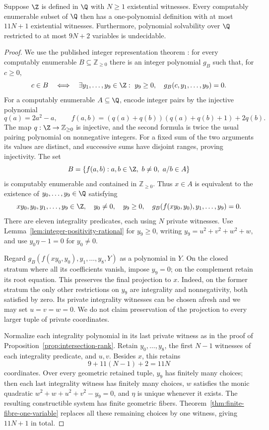 \begin{proposition}\label{prop:quantitative-mrdp}
Suppose $\Z$ is defined in $\Q$ with $N\ge1$ existential witnesses.
Every computably enumerable subset of $\Q$ then has a one-polynomial
definition with at most $11N+1$ existential witnesses. Furthermore,
polynomial solvability over $\Q$ restricted to at most $9N+2$
variables is undecidable.
\end{proposition}
\begin{proof}
We use the published integer representation theorem
\cite[Theorem 1.1(i)]{Sun2021}: for every computably enumerable
$B\subseteq\mathbb Z_{\ge0}$ there is an integer polynomial $g_B$
such that, for $c\ge0$,
\[
 c\in B\quad\Longleftrightarrow\quad
 \exists y_1,\ldots,y_9\in\Z:\
 y_9\ge0,\quad g_B(c,y_1,\ldots,y_9)=0.
\]
For a computably enumerable $A\subseteq\Q$, encode integer pairs
by the injective polynomial
\[
 q(a)=2a^2-a,\qquad
 f(a,b)=(q(a)+q(b))(q(a)+q(b)+1)+2q(b).
\]
The map $q:\Z\to\mathbb Z_{\ge0}$ is injective, and the second
formula is twice the usual pairing polynomial on nonnegative integers.
For a fixed sum of the two arguments its values are distinct, and
successive sums have disjoint ranges, proving injectivity.
The set
\[
 B=\{f(a,b):a,b\in\Z,\ b\ne0,\ a/b\in A\}
\]
is computably enumerable and contained in $\mathbb Z_{\ge0}$.
Thus $x\in A$ is equivalent to the existence of
$y_0,\ldots,y_9\in\Q$ satisfying
\[
 xy_0,y_0,y_1,\ldots,y_9\in\Z,\quad
 y_0\ne0,\quad y_9\ge0,\quad
 g_B(f(xy_0,y_0),y_1,\ldots,y_9)=0.
\]
There are eleven integrality predicates, each using $N$ private
witnesses. Use Lemma~\ref{lem:integer-positivity-rational} for
$y_9\ge0$, writing $y_9=u^2+v^2+w^2+w$, and use
$y_0\eta-1=0$ for $y_0\ne0$.

Regard $g_B(f(xy_0,y_0),y_1,\ldots,y_8,Y)$ as a polynomial in $Y$.
On the closed stratum where all its coefficients vanish, impose
$y_9=0$; on the complement retain its root equation. This preserves
the final projection to $x$. Indeed, on the former stratum the only
other restrictions on $y_9$ are integrality and nonnegativity, both
satisfied by zero. Its private integrality witnesses can be chosen
afresh and we may set $u=v=w=0$. We do not claim preservation of
the projection to every larger tuple of private coordinates.

Normalize each integrality polynomial in its last private witness as
in the proof of Proposition~\ref{prop:intersection-rank}. Retain
$y_0,\ldots,y_8$, the first $N-1$ witnesses of each integrality
predicate, and $u,v$. Besides $x$, this retains
\[
 9+11(N-1)+2=11N
\]
coordinates. Over every geometric retained tuple, $y_9$ has finitely
many choices; then each last integrality witness has finitely many
choices, $w$ satisfies the monic quadratic
$w^2+w+u^2+v^2-y_9=0$, and $\eta$ is unique whenever it exists.
The resulting constructible system has finite geometric fibers.
Theorem~\ref{thm:finite-fibre-one-variable} replaces all these
remaining choices by one witness, giving $11N+1$ in total.


\end{proof}
